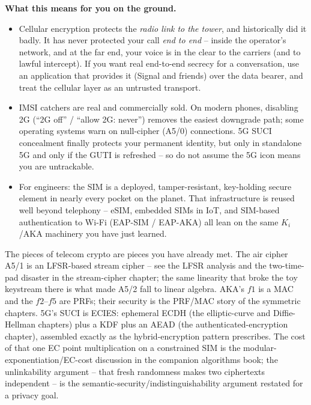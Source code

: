 \begin{applicationbox}
\textbf{What this means for you on the ground.}
\begin{itemize}
  \item Cellular encryption protects the \emph{radio link to the tower}, and historically did it badly. It has never protected your call \emph{end to end} -- inside the operator's network, and at the far end, your voice is in the clear to the carriers (and to lawful intercept). If you want real end-to-end secrecy for a conversation, use an application that provides it (Signal and friends) over the data bearer, and treat the cellular layer as an untrusted transport.
  \item IMSI catchers are real and commercially sold. On modern phones, disabling 2G (``2G off'' / ``allow 2G: never'') removes the easiest downgrade path; some operating systems warn on null-cipher (A5/0) connections. 5G SUCI concealment finally protects your permanent identity, but only in standalone 5G and only if the GUTI is refreshed -- so do not assume the 5G icon means you are untrackable.
  \item For engineers: the SIM is a deployed, tamper-resistant, key-holding secure element in nearly every pocket on the planet. That infrastructure is reused well beyond telephony -- eSIM, embedded SIMs in IoT, and SIM-based authentication to Wi-Fi (EAP-SIM / EAP-AKA) all lean on the same $K_i$/AKA machinery you have just learned.
  \end{itemize}
\end{applicationbox}

\begin{connectionbox}
The pieces of telecom crypto are pieces you have already met. The air cipher A5/1 is an LFSR-based stream cipher -- see the LFSR analysis and the two-time-pad disaster in the stream-cipher chapter; the same linearity that broke the toy keystream there is what made A5/2 fall to linear algebra. AKA's $f1$ is a MAC and the $f2$--$f5$ are PRFs; their security is the PRF/MAC story of the symmetric chapters. 5G's SUCI is ECIES: ephemeral ECDH (the elliptic-curve and Diffie-Hellman chapters) plus a KDF plus an AEAD (the authenticated-encryption chapter), assembled exactly as the hybrid-encryption pattern prescribes. The cost of that one EC point multiplication on a constrained SIM is the modular-exponentiation/EC-cost discussion in the companion algorithms book; the unlinkability argument -- that fresh randomness makes two ciphertexts independent -- is the semantic-security/indistinguishability argument restated for a privacy goal.
\end{connectionbox}

